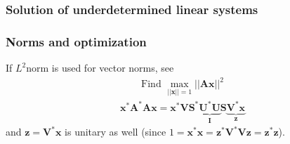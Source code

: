 \documentclass[letterpaper,10pt,english]{jupyterBook}
\begin{document}
\subsubsection{Solution of under\sphinxhyphen{}determined linear systems}
\label{\detokenize{ch/linear-algebra/svd:solution-of-under-determined-linear-systems}}

\subsubsection{Norms and optimization}
\label{\detokenize{ch/linear-algebra/svd:norms-and-optimization}}
\sphinxAtStartPar
If \(L^2\)\sphinxhyphen{}norm is used for vector norms, see {\hyperref[\detokenize{ch/linear-algebra/svd:svd-optimization-norm}]{}}
\begin{equation*}
\begin{split}\text{Find } \max_{||\mathbf{x}||=1} ||\mathbf{A} \mathbf{x}||^2\end{split}
\end{equation*}\begin{equation*}
\begin{split}\mathbf{x}^* \mathbf{A}^* \mathbf{A} \mathbf{x} = \mathbf{x}^* \mathbf{V} \mathbf{S}^* \underbrace{\mathbf{U}^* \mathbf{U}}_{\mathbf{I}} \mathbf{S} \underbrace{\mathbf{V}^* \mathbf{x}}_{\mathbf{z}}\end{split}
\end{equation*}
\sphinxAtStartPar
and \(\mathbf{z} = \mathbf{V}^* \mathbf{x}\) is unitary as well (since \(1= \mathbf{x}^* \mathbf{x} = \mathbf{z}^* \mathbf{V}^* \mathbf{V} \mathbf{z} = \mathbf{z}^* \mathbf{z} \)).
\end{document}
